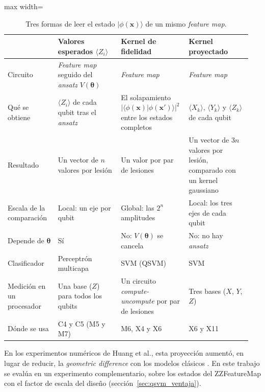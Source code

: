 \begin{table}[htbp]
\centering
\small
\caption{Tres formas de leer el estado $|\phi(\mathbf{x})\rangle$ de un mismo \textit{feature map}.}
\label{tab:lecturas_estado}
\begin{adjustbox}{max width=\linewidth}
\begin{tabular}{p{0.2\linewidth} p{0.25\linewidth} p{0.25\linewidth} p{0.25\linewidth}}
\toprule
 & \textbf{Valores esperados $\langle Z_i\rangle$} & \textbf{Kernel de fidelidad} & \textbf{Kernel proyectado} \\
\midrule
Circuito & \textit{Feature map} seguido del \textit{ansatz} $V(\boldsymbol\theta)$ & \textit{Feature map} & \textit{Feature map} \\
Qué se obtiene & $\langle Z_i\rangle$ de cada qubit tras el \textit{ansatz} & El solapamiento $|\langle\phi(\mathbf{x})|\phi(\mathbf{x}')\rangle|^2$ entre los estados completos & $\langle X_k\rangle$, $\langle Y_k\rangle$ y $\langle Z_k\rangle$ de cada qubit \\
Resultado & Un vector de $n$ valores por lesión & Un valor por par de lesiones & Un vector de $3n$ valores por lesión, comparado con un kernel gaussiano \\
Escala de la comparación & Local: un eje por qubit & Global: las $2^n$ amplitudes & Local: los tres ejes de cada qubit \\
Depende de $\boldsymbol\theta$ & Sí & No: $V(\boldsymbol\theta)$ se cancela & No: no hay \textit{ansatz} \\
Clasificador & Perceptrón multicapa & SVM (QSVM) & SVM \\
Medición en un procesador & Una base ($Z$) para todos los qubits & Un circuito \textit{compute-uncompute} por par de lesiones & Tres bases ($X$, $Y$, $Z$) \\
Dónde se usa & C4 y C5 (M5 y M7) & M6, X4 y X6 & X6 y X11 \\
\bottomrule
\end{tabular}
\end{adjustbox}
\end{table}

En los experimentos numéricos de Huang et al., esta proyección aumentó, en lugar de reducir, la \textit{geometric difference} con los modelos clásicos \cite{huang2021power}. En este trabajo se evalúa en un experimento complementario, sobre los estados del ZZFeatureMap con el factor de escala del diseño (sección~\ref{sec:qsvm_ventaja}).
